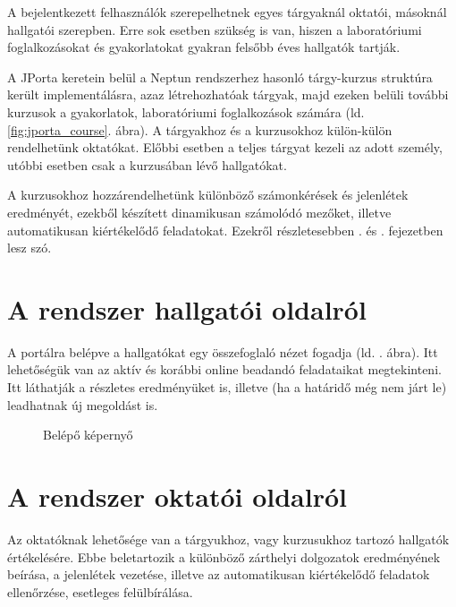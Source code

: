     A bejelentkezett felhasználók szerepelhetnek egyes tárgyaknál oktatói, másoknál hallgatói szerepben. Erre sok esetben szükség is van, hiszen a laboratóriumi foglalkozásokat és gyakorlatokat gyakran felsőbb éves hallgatók tartják.

    A JPorta keretein belül a Neptun rendszerhez hasonló tárgy-kurzus struktúra került implementálásra, azaz létrehozhatóak tárgyak, majd ezeken belüli további kurzusok a gyakorlatok, laboratóriumi foglalkozások számára (ld. \ref{fig:jporta_course}. ábra). A tárgyakhoz és a kurzusokhoz külön-külön rendelhetünk oktatókat. Előbbi esetben a teljes tárgyat kezeli az adott személy, utóbbi esetben csak a kurzusában lévő hallgatókat.
    
    A kurzusokhoz hozzárendelhetünk különböző számonkérések és jelenlétek eredményét, ezekből készített dinamikusan számolódó mezőket, illetve automatikusan kiértékelődő feladatokat. Ezekről részletesebben . és . fejezetben lesz szó.
     
\section{A rendszer hallgatói oldalról}
    A portálra belépve a hallgatókat egy összefoglaló nézet fogadja (ld. . ábra). Itt lehetőségük van az aktív és korábbi online beadandó feladataikat megtekinteni. Itt láthatják a részletes eredményüket is, illetve (ha a határidő még nem járt le) leadhatnak új megoldást is.
    
    \begin{figure}[h]
        \centering
        \caption{Belépő képernyő}
        \label{fig:jporta_home}
    \end{figure}
 
\section{A rendszer oktatói oldalról}
    Az oktatóknak lehetősége van a tárgyukhoz, vagy kurzusukhoz tartozó hallgatók értékelésére. Ebbe beletartozik a különböző zárthelyi dolgozatok eredményének beírása, a jelenlétek vezetése, illetve az automatikusan kiértékelődő feladatok ellenőrzése, esetleges felülbírálása.